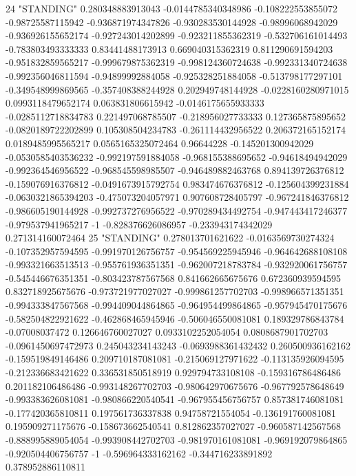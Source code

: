 24 "STANDING" 0.280348883913043 -0.0144785340348986 -0.108222553855072 -0.98725587115942 -0.936871974347826 -0.930283530144928 -0.98996068942029 -0.936926155652174 -0.927243014202899 -0.923211855362319 -0.532706161014493 -0.783803493333333 0.83441488173913 0.669040315362319 0.811290691594203 -0.951832859565217 -0.999679875362319 -0.998124360724638 -0.992331340724638 -0.992356046811594 -0.94899992884058 -0.925328251884058 -0.513798177297101 -0.349548999869565 -0.357408388244928 0.202949748144928 -0.0228160280971015 0.0993118479652174 0.063831806615942 -0.0146175655933333 -0.0285112718834783 0.221497068785507 -0.218956027733333 0.127365875895652 -0.0820189722202899 0.105308504234783 -0.261114432956522 0.206372165152174 0.0189485995565217 0.0565165325072464 0.96644228 -0.145201300942029 -0.0530585403536232 -0.992197591884058 -0.968155388695652 -0.94618494942029 -0.992364546956522 -0.968545598985507 -0.946489882463768 0.894139726376812 -0.159076916376812 -0.0491673915792754 0.983474676376812 -0.125604399231884 -0.0630321865394203 -0.475073204057971 0.907608728405797 -0.967241846376812 -0.986605190144928 -0.992737276956522 -0.970289434492754 -0.947443417246377 -0.979537941965217 -1 -0.828376626086957 -0.233943174342029 0.271314160072464
25 "STANDING" 0.278013701621622 -0.0163569730274324 -0.107352957594595 -0.991970126756757 -0.954569225945946 -0.964642688108108 -0.993321663513513 -0.955761936351351 -0.962007218783784 -0.932920061756757 -0.545446676351351 -0.803423787567568 0.841662665675676 0.672360939594595 0.832718925675676 -0.973721977027027 -0.999861257702703 -0.998966571351351 -0.994333847567568 -0.994409044864865 -0.964954499864865 -0.957945470175676 -0.582504822921622 -0.462868465945946 -0.506046550081081 0.189329786843784 -0.07008037472 0.126646760027027 0.0933102252054054 0.0808687901702703 -0.0961450697472973 0.245043234143243 -0.0693988361432432 0.260500936162162 -0.159519849146486 0.209710187081081 -0.215069127971622 -0.113135926094595 -0.212336683421622 0.336531850518919 0.929794733108108 -0.159316786486486 0.201182106486486 -0.993148267702703 -0.980642970675676 -0.967792578648649 -0.993383626081081 -0.980866220540541 -0.967955456756757 0.857381746081081 -0.177420365810811 0.197561736337838 0.94758721554054 -0.136191760081081 0.195909271175676 -0.158673662540541 0.812862357027027 -0.960587142567568 -0.888995889054054 -0.993908442702703 -0.981970161081081 -0.969192079864865 -0.920504406756757 -1 -0.596964333162162 -0.344716233891892 0.378952886110811
